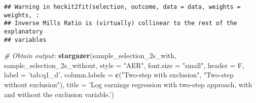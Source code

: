 \documentclass[
]{article}
\newenvironment{Shaded}{\begin{snugshade}}{\end{snugshade}}
\newcommand{\CommentTok}[1]{\textcolor[rgb]{0.56,0.35,0.01}{\textit{#1}}}
\newcommand{\DataTypeTok}[1]{\textcolor[rgb]{0.13,0.29,0.53}{#1}}
\newcommand{\KeywordTok}[1]{\textcolor[rgb]{0.13,0.29,0.53}{\textbf{#1}}}
\newcommand{\NormalTok}[1]{#1}
\newcommand{\StringTok}[1]{\textcolor[rgb]{0.31,0.60,0.02}{#1}}
\begin{document}
\begin{verbatim}
## Warning in heckit2fit(selection, outcome, data = data, weights = weights, :
## Inverse Mills Ratio is (virtually) collinear to the rest of the explanatory
## variables
\end{verbatim}

\begin{Shaded}
\begin{Highlighting}[]
\CommentTok{# Obtain output:}
\KeywordTok{stargazer}\NormalTok{(sample_selection_2s_with, sample_selection_2s_without,}
          \DataTypeTok{style =} \StringTok{"AER"}\NormalTok{,}
          \DataTypeTok{font.size =} \StringTok{"small"}\NormalTok{,}
          \DataTypeTok{header =}\NormalTok{ F, }\DataTypeTok{label =} \StringTok{'tab:q1_d'}\NormalTok{,}
          \DataTypeTok{column.labels =} \KeywordTok{c}\NormalTok{(}\StringTok{"Two-step with exclusion"}\NormalTok{, }\StringTok{"Two-step without exclusion"}\NormalTok{),}
          \DataTypeTok{title =} \StringTok{'Log earnings regression with two-step approach, }
\StringTok{          with and without the exclusion variable.'}\NormalTok{)}
\end{Highlighting}
\end{Shaded}
\end{document}
